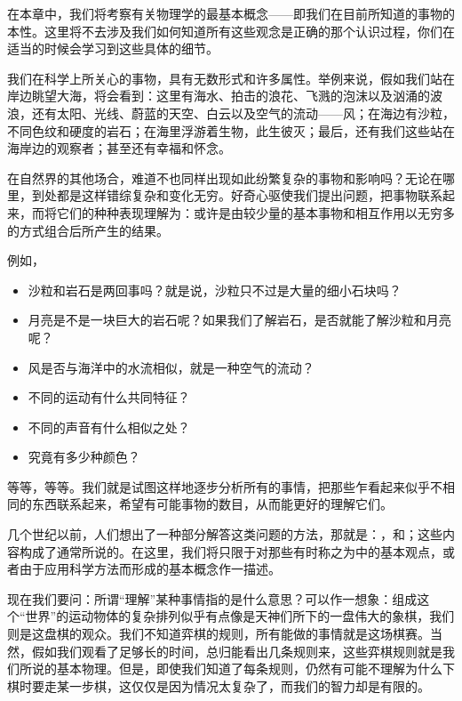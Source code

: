  在本章中，我们将考察有关物理学的最基本概念——即我们在目前所知道的事物的本性。这里将不去涉及我们如何知道所有这些观念是正确的那个认识过程，你们在适当的时候会学习到这些具体的细节。

 我们在科学上所关心的事物，具有无数形式和许多属性。举例来说，假如我们站在岸边眺望大海，将会看到：这里有海水、拍击的浪花、飞溅的泡沫以及汹涌的波浪，还有太阳、光线、蔚蓝的天空、白云以及空气的流动——风；在海边有沙粒，不同色纹和硬度的岩石；在海里浮游着生物，此生彼灭；最后，还有我们这些站在海岸边的观察者；甚至还有幸福和怀念。

在自然界的其他场合，难道不也同样出现如此纷繁复杂的事物和影响吗？无论在哪里，到处都是这样错综复杂和变化无穷。好奇心驱使我们提出问题，把事物联系起来，而将它们的种种表现理解为：或许是由较少量的基本事物和相互作用以无穷多的方式组合后所产生的结果。

例如，

\begin{itemize}
  \item 沙粒和岩石是两回事吗？就是说，沙粒只不过是大量的细小石块吗？
  \item 月亮是不是一块巨大的岩石呢？如果我们了解岩石，是否就能了解沙粒和月亮呢？
  \item 风是否与海洋中的水流相似，就是一种空气的流动？
  \item 不同的运动有什么共同特征？
  \item 不同的声音有什么相似之处？
  \item 究竟有多少种颜色？
\end{itemize}

等等，等等。我们就是试图这样地逐步分析所有的事情，把那些乍看起来似乎不相同的东西联系起来，希望有可能事物的数目，从而能更好的理解它们。

几个世纪以前，人们想出了一种部分解答这类问题的方法，那就是：，和；这些内容构成了通常所说的。在这里，我们将只限于对那些有时称之为中的基本观点，或者由于应用科学方法而形成的基本概念作一描述。

 现在我们要问：所谓“理解”某种事情指的是什么意思？可以作一想象：组成这个“世界”的运动物体的复杂排列似乎有点像是天神们所下的一盘伟大的象棋，我们则是这盘棋的观众。我们不知道弈棋的规则，所有能做的事情就是这场棋赛。当然，假如我们观看了足够长的时间，总归能看出几条规则来，这些弈棋规则就是我们所说的基本物理。但是，即使我们知道了每条规则，仍然有可能不理解为什么下棋时要走某一步棋，这仅仅是因为情况太复杂了，而我们的智力却是有限的。


